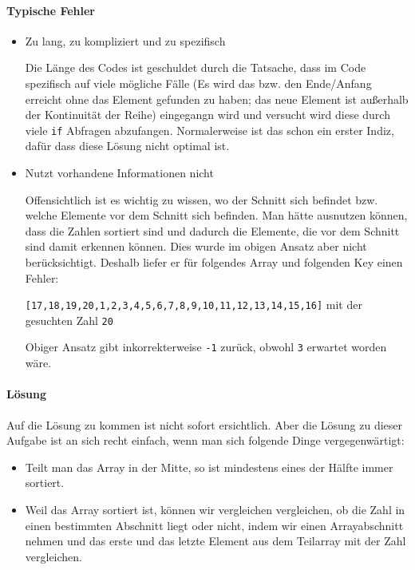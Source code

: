 \documentclass[babel]{book}
\begin{document}
\paragraph{Typische Fehler}
\begin{itemize} 
	\item Zu lang, zu kompliziert und zu spezifisch
	
	Die Länge des Codes ist geschuldet durch die Tatsache, dass im Code spezifisch auf viele mögliche Fälle (Es wird das bzw. den Ende/Anfang erreicht ohne das Element gefunden zu haben; das neue Element ist außerhalb der Kontinuität der Reihe) eingegangn wird und versucht wird diese durch viele \lstinline|if| Abfragen abzufangen. Normalerweise ist das schon ein erster Indiz, dafür dass diese Lösung nicht optimal ist. 
	
	\item Nutzt vorhandene Informationen nicht
	
	Offensichtlich ist es wichtig zu wissen, wo der Schnitt sich befindet bzw. welche Elemente vor dem Schnitt sich befinden. Man hätte ausnutzen können, dass die Zahlen sortiert sind und dadurch die Elemente, die vor dem Schnitt sind damit erkennen können. Dies wurde im obigen Ansatz aber nicht berücksichtigt. Deshalb liefer er für folgendes Array und folgenden Key einen Fehler:
	
	 \lstinline|[17,18,19,20,1,2,3,4,5,6,7,8,9,10,11,12,13,14,15,16]| mit der gesuchten Zahl \lstinline|20|
	 
	 Obiger Ansatz gibt inkorrekterweise \lstinline|-1| zurück, obwohl \lstinline|3| erwartet worden wäre.
	
\end{itemize}
\paragraph{Lösung} Auf die Lösung zu kommen ist nicht sofort ersichtlich. Aber die Lösung zu dieser Aufgabe ist an sich recht einfach, wenn man sich folgende Dinge vergegenwärtigt:

\begin{itemize} 
	\item Teilt man das Array in der Mitte, so ist mindestens eines der Hälfte immer sortiert.
	
	\item Weil das Array sortiert ist, können wir vergleichen vergleichen, ob die Zahl in einen bestimmten Abschnitt liegt oder nicht, indem wir einen Arrayabschnitt nehmen und das erste und das letzte Element aus dem Teilarray mit der Zahl vergleichen.
\end{itemize}
\end{document}

